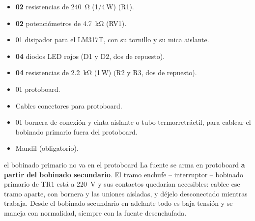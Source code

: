 \documentclass[11pt,a4paper]{article}
\begin{document}
\begin{itemize}
    \item \textbf{02} resistencias de \qty{240}{\ohm} (1/4\,\unit{\watt}) (R1).
    \item \textbf{02} potenciómetros de \qty{4.7}{\kilo\ohm} (RV1).
    \item 01 disipador para el LM317T, con su tornillo y su mica aislante.
    \item \textbf{04} diodos LED rojos (D1 y D2, dos de repuesto).
    \item \textbf{04} resistencias de \qty{2.2}{\kilo\ohm} (1\,\unit{\watt}) (R2 y R3,
          dos de repuesto).
    \item 01 protoboard.
    \item Cables conectores para protoboard.
    \item 01 bornera de conexión y cinta aislante o tubo termorretráctil, para cablear
          el bobinado primario fuera del protoboard.
    \item Mandil (obligatorio).
\end{itemize}

\begin{seguridad}{el bobinado primario no va en el protoboard}
La fuente se arma en protoboard \textbf{a partir del bobinado secundario}. El tramo enchufe --
interruptor -- bobinado primario de TR1 está a \qty{220}{\volt} y sus contactos quedarían
accesibles: cablee ese tramo aparte, con bornera y las uniones aisladas, y déjelo
desconectado mientras trabaja. Desde el bobinado secundario en adelante todo es baja tensión y se
maneja con normalidad, siempre con la fuente desenchufada.
\end{seguridad}

\FloatBarrier
\end{document}
